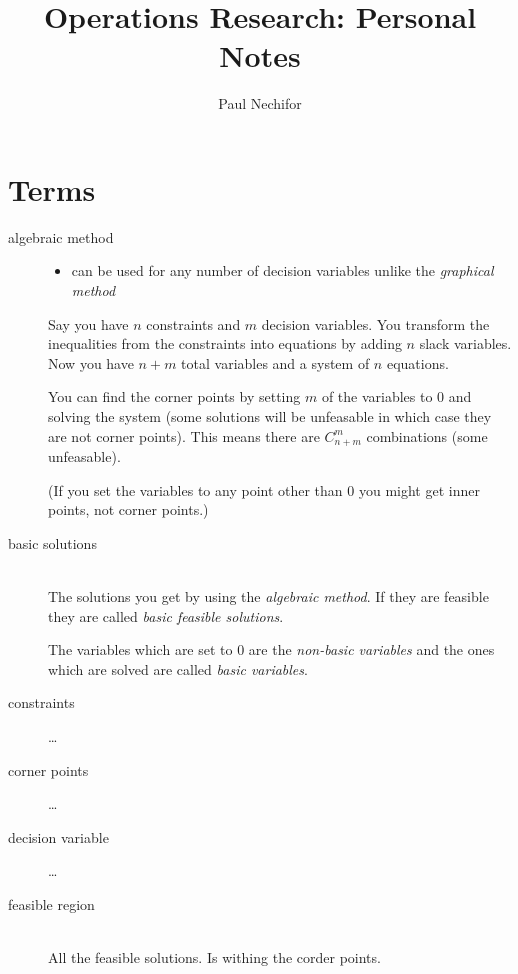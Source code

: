\documentclass[a4paper, 12pt]{article}
\title{Operations Research: Personal Notes}
\author{Paul Nechifor}
\begin{document}
\maketitle

\section{Terms}

\begin{description}

\item[algebraic method] \hfill
    \begin{itemize}
    \item can be used for any number of decision variables unlike the
        \emph{graphical method}
    \end{itemize}
    
    Say you have $n$ constraints and $m$ decision variables. You transform the
    inequalities from the constraints into equations by adding $n$ slack
    variables. Now you have $n+m$ total variables and a system of $n$ equations.
    
    You can find the corner points by setting $m$ of the variables to 0 and
    solving the system (some solutions will be unfeasable in which case they are
    not corner points). This means there are $C_{n+m}^m$ combinations (some
    unfeasable).
    
    (If you set the variables to any point other than 0 you
    might get inner points, not corner points.)

\item[basic solutions] \hfill \\
    The solutions you get by using the \emph{algebraic method}. If they are
    feasible they are called \emph{basic feasible solutions}.
    
    The variables which are set to 0 are the \emph{non-basic variables} and the
    ones which are solved are called \emph{basic variables}.

\item[constraints] \ldots

\item[corner points] \ldots

\item[decision variable] \ldots

\item[feasible region] \hfill \\
    All the feasible solutions. Is withing the corder points.


\end{description}
\end{document}
